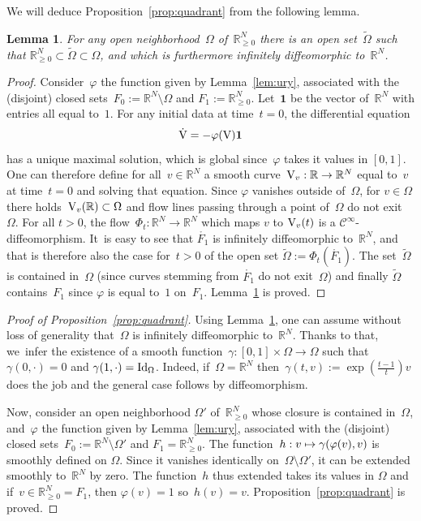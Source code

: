 \documentclass[10pt]{amsart}
\newcommand\mto{\mathchoice{\longmapsto}{\mapsto}{\mapsto}{\mapsto}}
\newtheorem{lem}[prop]{Lemma}
\theoremstyle{definition}
\newcommand\R{\mathbb{R}}
\let\ffi\varphi
\begin{document}
We will deduce Proposition~\ref{prop:quadrant} from the following lemma.
\begin{lem}\label{lem:ouv}
For any open neighborhood~$\Omega$ of~$\R_{\geq 0}^N$ there is an open set~$\widetilde \Omega$ such that ${\R_{\geq 0}^N}\subset\widetilde{\Omega}\subset\Omega$, and which is furthermore infinitely diffeomorphic to~$\R^N$.
\end{lem}
\begin{proof}
Consider~$\ffi$ the function given by Lemma~\ref{lem:ury}, associated with the (disjoint) closed sets~$F_0:=\R^N\setminus \Omega$ and $F_1:=\R_{\geq 0}^N$. Let~$\mathbf{1}$ be the vector of~$\R^N$ with entries all equal to~$1$. For any initial data at time~$t=0$, the differential equation
\[
\dot{\textnormal{V}} = -\ffi(\textnormal{V})\mathbf{1}
\]
has a unique maximal solution, which is global since~$\ffi$ takes it values in $[0,1]$. One can
therefore define for all~$v\in \R^N$ a smooth curve~$\textnormal{V}_v:\R\to\R^N$ equal to~$v$ at time~$t=0$ and solving that equation. Since $\ffi$ vanishes outside of~$\Omega$, for $v \in \Omega$ there holds~$\textnormal{V}_v(\R)\subset \Omega$ and flow lines passing through a point of~$\Omega$ do not exit~$\Omega$. For all $t>0$, the flow~$\Phi_t: \R^N\to\R^N$ which maps $v$ to $\textnormal{V}_v(t)$ is a $\mathscr{C}^\infty$-diffeomorphism. It~is easy to see that $\mathring{F_1}$ is infinitely diffeomorphic to~$\R^N$, and that is therefore also the case for~$t>0$ of the open set $ \widetilde \Omega:=\Phi_t(\mathring{F_1})$. The set~$ \widetilde \Omega$ is contained in~$\Omega$ (since curves stemming from $\mathring{F_1}$ do not exit~$\Omega$) and finally $ \widetilde \Omega$ contains~$F_1$ since $\ffi$ is equal to~$1$ on~$F_1$. Lemma~\ref{lem:ouv} is proved.
\end{proof}

\begin{proof}[Proof of Proposition~\ref{prop:quadrant}]
Using Lemma~\ref{lem:ouv}, one can assume without loss of generality that~$\Omega $ is infinitely diffeomorphic to~$\R^N$. Thanks to that, we~infer the existence of a smooth function~$\gamma:[0,1]\times \Omega \to \Omega$ such that $\gamma(0,\cdot)=0$ and $\gamma(1,\cdot) = \textnormal{Id}_ \Omega$. Indeed, if~$\Omega=\R^N$ then~$\gamma(t,v):= \exp\left(\frac{t-1}{t}\right)v$ does the job and the general case follows by diffeomorphism.

Now, consider an open neighborhood $\Omega'$ of~$\R_{\geq 0}^N$ whose closure is contained in~$\Omega$, and~$\ffi$ the function given by Lemma~\ref{lem:ury}, associated with the (disjoint) closed sets~$F_0:=\R^N\setminus \Omega'$ and $F_1=\R_{\geq 0}^N$. The function~$h:v \mto \gamma(\ffi(v),v)$ is smoothly defined on $\Omega$. Since it vanishes identically on~$\Omega\setminus \Omega'$, it can be extended smoothly to~$\R^N$ by zero. The function~$h$ thus extended takes its values in $\Omega$ and if~$v\in \R_{\geq 0}^N=F_1$, then $\ffi(v)=1$ so~$h(v)=v$. Proposition~\ref{prop:quadrant} is proved.
\end{proof}
\end{document}
